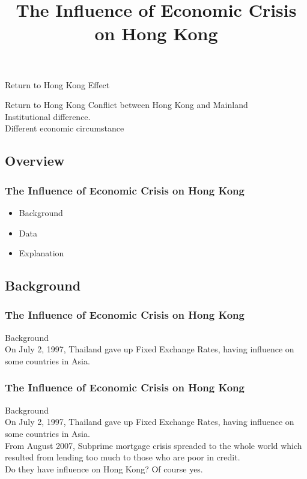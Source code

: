 \documentclass[slidestop,uncompress,mathsans, 12pt]{beamer}
\begin{document}
\begin{frame}{Return to Hong Kong}
Effect
\begin{block}{}
\end{block}
\end{frame}
\begin{frame}{Return to Hong Kong}
Conflict between Hong Kong and Mainland\\
\bigskip
\bigskip
Institutional difference.\\
\bigskip
\bigskip
Different economic circumstance 

\end{frame}
\subsection{Overview}
\begin{frame}
\title{The Influence of Economic Crisis on Hong Kong }
\date{}
\titlepage
\end{frame}
\begin{frame}[shrink]
\frametitle{The Influence of Economic Crisis on Hong Kong 
}
\begin{itemize}
\item Background
\bigskip
\item Data
\bigskip
\item Explanation
\end{itemize}
\end{frame}
\pageTransitionSplitVI
\subsection{Background}
\begin{frame}

\frametitle{The Influence of Economic Crisis on Hong Kong }
Background\\
\bigskip
\transglitter[direction=315]
On July 2, 1997, Thailand gave up Fixed Exchange Rates, having influence on some countries in Asia.\\
\end{frame}
\begin{frame}
\frametitle{The Influence of Economic Crisis on Hong Kong }
Background\\
\bigskip
On July 2, 1997, Thailand gave up Fixed Exchange Rates, having influence on some countries in Asia.\\
\bigskip
{}
From August 2007, Subprime mortgage crisis spreaded to the whole world which resulted from lending too much to those who are poor in credit.\\
\bigskip
Do they have influence on Hong Kong? Of course yes.
\end{frame}
\end{document}

